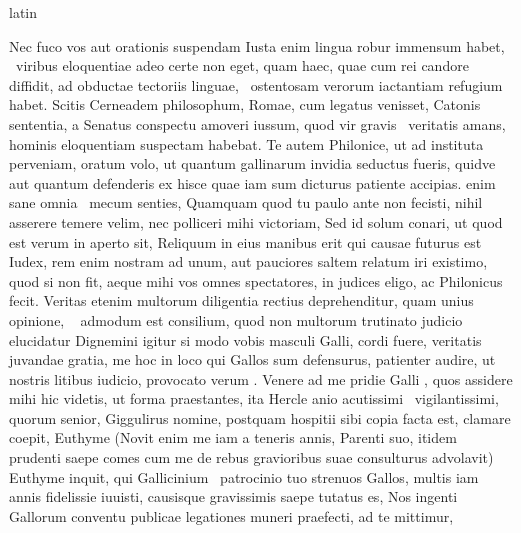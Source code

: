 \documentclass[12pt]{book}
\renewenvironment{latin}
    	{\begin{hyphenrules}{latin}}
    	{\end{hyphenrules}}
\begin{document}
\begin{pages}
\begin{latin}
\begin{Leftside}
                  Nec fuco vos aut orationis  suspendam Iusta enim lingua robur immensum habet,  \ampersand\ viribus eloquentiae adeo certe non eget,
                  quam haec, quae cum rei candore diffidit, ad obductae tectoriis  linguae,  \ampersand\ ostentosam verorum iactantiam refugium habet. 
                  Scitis Cerneadem philosophum, Romae, cum legatus venisset, Catonis sententia, a Senatus conspectu amoveri iussum, quod vir gravis  \ampersand\ veritatis amans, hominis eloquentiam suspectam habebat.
                  Te autem Philonice, ut ad instituta perveniam, oratum volo, ut quantum gallinarum invidia seductus fueris, quidve aut quantum defenderis ex hisce quae iam sum dicturus patiente accipias.
                   enim sane omnia  \ampersand\ mecum senties, Quamquam quod tu paulo ante non fecisti, nihil asserere temere velim,
                  nec polliceri mihi victoriam, Sed id solum conari, ut quod est verum in aperto sit, Reliquum in eius manibus erit qui causae futurus est Iudex, rem enim nostram ad unum, aut pauciores saltem relatum iri existimo,
                  quod si non fit, aeque mihi vos omnes spectatores, in judices eligo, ac Philonicus fecit. Veritas etenim multorum diligentia rectius deprehenditur, quam unius opinione,
                   \ampersand\  admodum est consilium, quod non multorum trutinato judicio elucidatur Dignemini igitur si modo vobis masculi Galli, 
                  cordi  fuere, veritatis  \ampersand\  juvandae gratia, me hoc in loco
                  qui Gallos sum defensurus, patienter audire, ut nostris litibus iudicio, provocato verum .
                  Venere ad me pridie Galli , quos assidere mihi hic videtis, ut forma praestantes, ita Hercle anio acutissimi  \ampersand\ vigilantissimi,
                  quorum senior, Giggulirus nomine, postquam hospitii sibi copia facta est, clamare coepit, Euthyme (Novit enim me iam a teneris annis, Parenti suo, itidem prudenti saepe comes cum me de rebus
                  gravioribus  suae consulturus advolavit) Euthyme inquit, qui Gallicinium 
                   \ampersand\ patrocinio tuo strenuos Gallos, multis iam annis fidelissie iuuisti, causisque gravissimis saepe tutatus es, Nos ingenti Gallorum conventu publicae legationes muneri praefecti, ad te mittimur,

\end{Leftside}
\end{latin}
\end{pages}
\end{document}
